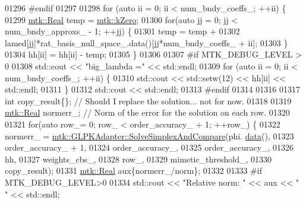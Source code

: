\begin{DoxyCode}
{{01296 \textcolor{preprocessor}{    #endif}
01297 
01298     \textcolor{keywordflow}{for} (\textcolor{keyword}{auto} ii = 0; ii < num\_bndy\_coeffs\_; ++ii) \{
01299       \hyperlink{group__c01-roots_gac080bbbf5cbb5502c9f00405f894857d}{mtk::Real} temp = \hyperlink{group__c01-roots_ga59a451a5fae30d59649bcda274fea271}{mtk::kZero};
01300       \textcolor{keywordflow}{for}(\textcolor{keyword}{auto} jj = 0; jj < num\_bndy\_approxs\_ - 1; ++jj) \{
01301         temp = temp +
01302           lamed[jj]*rat\_basis\_null\_space\_.data()[jj*num\_bndy\_coeffs\_ + ii];
01303       \}
01304       hh[ii] = hh[ii] - temp;
01305     \}
01306 
01307 \textcolor{preprocessor}{    #if MTK\_DEBUG\_LEVEL > 0}
01308     std::cout << \textcolor{stringliteral}{"big\_lambda ="} << std::endl;
01309     \textcolor{keywordflow}{for} (\textcolor{keyword}{auto} ii = 0; ii < num\_bndy\_coeffs\_; ++ii) \{
01310       std::cout << std::setw(12) << hh[ii] << std::endl;
01311     \}
01312     std::cout << std::endl;
01313 \textcolor{preprocessor}{    #endif}
01314 
01316 
01317     \textcolor{keywordtype}{int} copy\_result\{\};  \textcolor{comment}{// Should I replace the solution... not for now.}
01318 
01319     \hyperlink{group__c01-roots_gac080bbbf5cbb5502c9f00405f894857d}{mtk::Real} normerr\_; \textcolor{comment}{// Norm of the error for the solution on each row.}
01320 
01321     \textcolor{keywordflow}{for}(\textcolor{keyword}{auto} row\_= 0; row\_ < order\_accuracy\_ + 1; ++row\_) \{
01322       normerr\_ = \hyperlink{classmtk_1_1GLPKAdapter_a834480aca83e3c0d09fdab7fdb7e8a3f}{mtk::GLPKAdapter::SolveSimplexAndCompare}(phi.
      \hyperlink{classmtk_1_1DenseMatrix_a16b3ff56feb2658b9fc7147d1de4d8e7}{data}(),
01323                                                           order\_accuracy\_ + 1,
01324                                                           order\_accuracy\_,
01325                                                           order\_accuracy\_,
01326                                                           hh,
01327                                                           weights\_cbs\_,
01328                                                           row\_,
01329                                                           mimetic\_threshold\_,
01330                                                           copy\_result);
01331       \hyperlink{group__c01-roots_gac080bbbf5cbb5502c9f00405f894857d}{mtk::Real} aux\{normerr\_/norm\};
01332 
01333 \textcolor{preprocessor}{      #if MTK\_DEBUG\_LEVEL>0}
01334       std::cout << \textcolor{stringliteral}{"Relative norm: "} << aux << \textcolor{stringliteral}{" "} << std::endl;
}}
\end{DoxyCode}
